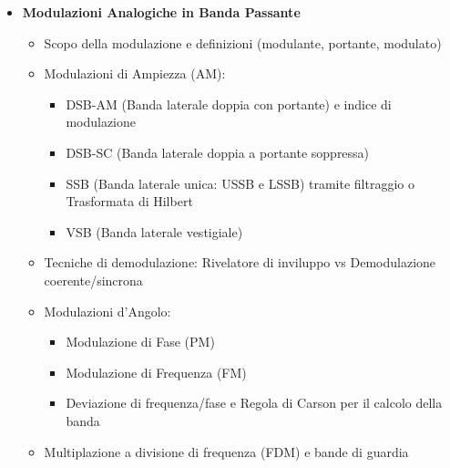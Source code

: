 \begin{itemize}
    \item \textbf{Modulazioni Analogiche in Banda Passante}
          \begin{itemize}
              \item Scopo della modulazione e definizioni (modulante, portante, modulato)
              \item Modulazioni di Ampiezza (AM):
                    \begin{itemize}
                        \item DSB-AM (Banda laterale doppia con portante) e indice di modulazione
                        \item DSB-SC (Banda laterale doppia a portante soppressa)
                        \item SSB (Banda laterale unica: USSB e LSSB) tramite filtraggio o Trasformata di Hilbert
                        \item VSB (Banda laterale vestigiale)
                    \end{itemize}
              \item Tecniche di demodulazione: Rivelatore di inviluppo vs Demodulazione coerente/sincrona
              \item Modulazioni d'Angolo:
                    \begin{itemize}
                        \item Modulazione di Fase (PM)
                        \item Modulazione di Frequenza (FM)
                        \item Deviazione di frequenza/fase e Regola di Carson per il calcolo della banda
                    \end{itemize}
              \item Multiplazione a divisione di frequenza (FDM) e bande di guardia
          \end{itemize}

\end{itemize}